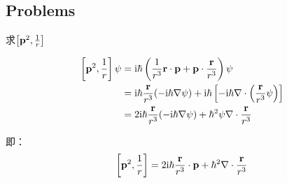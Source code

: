 \subsection*{Problems}


\begin{exercise}{求$\left[ {\bf p}^{2}, \frac{1}{r}\right]$}

  \begin{equation}
    \begin{aligned}
      \left[ {\bf p}^{2}, \frac{1}{r} \right]\psi &= {\rm i} \hbar \left(\frac{1}{r^{3}} {\bf r}\cdot {\bf p} + {\bf p}\cdot \frac{{\bf r}}{r^{3}}\right)\psi\\
                                                  &= {\rm i}\hbar \frac{{\bf r}}{r^{3}}(- {\rm i} \hbar \nabla \psi) + {\rm i}\hbar \left[- {\rm i} \hbar \nabla\cdot \left(\frac{{\bf r}}{r^{3}} \psi\right)\right]\\
                                                  &= 2 {\rm i} \hbar \frac{{\bf r}}{r^{3}} (- {\rm i} \hbar \nabla \psi) + \hbar^{2} \psi\nabla \cdot \frac{{\bf r}}{r^{3}}
    \end{aligned}
  \end{equation}

  即：
  \begin{equation}
    \begin{aligned}
      \left[{\bf p}^{2}, \frac{1}{r}\right] = 2 {\rm i} \hbar \frac{{\bf r}}{r^{3}}\cdot {\bf p} + \hbar^{2} \nabla\cdot \frac{{\bf r}}{r^{3}}
    \end{aligned}
  \end{equation}
  
\end{exercise}
